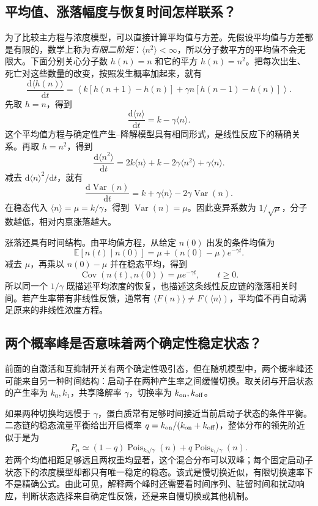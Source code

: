 \documentclass[11pt,a4paper,UTF8,fontset=fandol]{ctexart}
\newcommand{\dd}{\mathrm d}\newcommand{\R}{\mathbb R}\newcommand{\ssv}{\mathrm{ss}}
\begin{document}
\subsection{平均值、涨落幅度与恢复时间怎样联系？}
为了比较主方程与浓度模型，可以直接计算平均值与方差。先假设平均值与方差都是有限的，数学上称为\emph{有限二阶矩}：$\langle n^2\rangle<\infty$，所以分子数平方的平均值不会无限大。下面分别关心分子数 $h(n)=n$ 和它的平方 $h(n)=n^2$。把每次出生、死亡对这些数量的改变，按照发生概率加起来，就有
\[
\frac{\dd\langle h(n)\rangle}{\dd t}
=\left\langle k[h(n+1)-h(n)]+\gamma n[h(n-1)-h(n)]\right\rangle.
\]
先取 $h=n$，得到
\begin{equation}\frac{\dd\langle n\rangle}{\dd t}=k-\gamma\langle n\rangle.\end{equation}
这个平均值方程与确定性产生--降解模型具有相同形式，是线性反应下的精确关系。再取 $h=n^2$，得到
\[
\frac{\dd\langle n^2\rangle}{\dd t}=2k\langle n\rangle+k-2\gamma\langle n^2\rangle+\gamma\langle n\rangle.
\]
减去 $\dd\langle n\rangle^2/\dd t$，就有
\begin{equation}\frac{\dd\operatorname{Var}(n)}{\dd t}=k+\gamma\langle n\rangle-2\gamma\operatorname{Var}(n).\end{equation}
在稳态代入 $\langle n\rangle=\mu=k/\gamma$，得到 $\operatorname{Var}(n)=\mu$。因此变异系数为 $1/\sqrt\mu$，分子数越低，相对内禀涨落越大。

涨落还具有时间结构。由平均值方程，从给定 $n(0)$ 出发的条件均值为
\[
\mathbb E[n(t)\mid n(0)]=\mu+(n(0)-\mu)e^{-\gamma t}.
\]
减去 $\mu$，再乘以 $n(0)-\mu$ 并在稳态平均，得到
\begin{equation}\operatorname{Cov}(n(t),n(0))=\mu e^{-\gamma t},\qquad t\geq0.\end{equation}
所以同一个 $1/\gamma$ 既描述平均浓度的恢复，也描述这条线性反应链的涨落相关时间。若产生率带有非线性反馈，通常有 $\langle F(n)\rangle\ne F(\langle n\rangle)$，平均值不再自动满足原来的非线性浓度方程。

\subsection{两个概率峰是否意味着两个确定性稳定状态？}
前面的自激活和互抑制开关有两个确定性吸引态，但在随机模型中，两个概率峰还可能来自另一种时间结构：启动子在两种产生率之间缓慢切换。取关闭与开启状态的产生率为 $k_0,k_1$，共享降解率 $\gamma$，切换率为 $k_{\rm on},k_{\rm off}$。

如果两种切换均远慢于 $\gamma$，蛋白质常有足够时间接近当前启动子状态的条件平衡。二态链的稳态流量平衡给出开启概率 $q=k_{\rm on}/(k_{\rm on}+k_{\rm off})$，整体分布的领先阶近似于是为
\[
P_n\simeq(1-q)\operatorname{Pois}_{k_0/\gamma}(n)+q\operatorname{Pois}_{k_1/\gamma}(n).
\]
若两个均值相距足够远且两权重均显著，这个混合分布可以双峰；每个固定启动子状态下的浓度模型却都只有唯一稳定的稳态。该式是慢切换近似，有限切换速率下不是精确公式。由此可见，解释两个峰时还需要看时间序列、驻留时间和扰动响应，判断状态选择来自确定性反馈，还是来自慢切换或其他机制。
\end{document}
